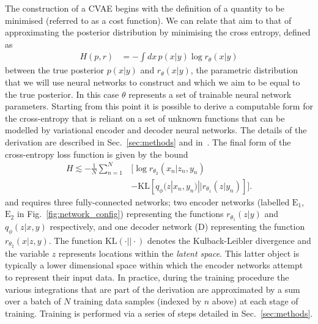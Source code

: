 \documentclass[%
showpacs,
 amsmath,amssymb,
 aps,
 twocolumn,
 prl,
 reprint,
floatfix,
]{revtex4-1}
\begin{document}
%
%
The construction of a \ac{CVAE} begins with the definition of a quantity to be
minimised (referred to as a cost function). We can relate that aim to
that of approximating the posterior distribution by minimising the cross
entropy, defined as
%
\begin{align}\label{eq:cross_ent} 
H(p,r) &= -\int dx\, p(x|y) \log r_{\theta}(x|y) 
\end{align}
%
between the true posterior $p(x|y)$ and $r_{\theta}(x|y)$, the parametric
distribution that we will use neural networks to construct and which we aim to
be equal to the true posterior. In this case $\theta$ represents a set of
trainable neural network parameters. Starting from this point it is possible to
derive a computable form for the cross-entropy that is reliant on a set of
unknown functions that can be modelled by variational encoder
and decoder neural networks. The details of the derivation are described in
Sec.~\ref{sec:methods} and in~\cite{1904.06264}. The final form of the
cross-entropy loss function is given by the bound
%
\begin{align}\label{eq:cost3}
H \lesssim -\frac{1}{N}\sum_{n=1}^{N}&\Big[\log
r_{\theta_{2}}(x_{n}|z_{n},y_{n})\nonumber\\
&-\text{KL}\left[q_{\phi}(z|x_{n},y_{n})||r_{\theta_{1}}(z|y_{n})\right]\Big].
\end{align}
%
and requires three fully-connected networks; two encoder networks (labelled
$\textrm{E}_1$, $\textrm{E}_2$ in Fig.~\ref{fig:network_config}) representing
the functions $r_{\theta_{1}}(z|y)$ and $q_{\phi}(z|x,y)$ respectively, and one
decoder network (D) representing the function $r_{\theta_{2}}(x|z,y)$. The
function $\text{KL}(\cdot||\cdot)$ denotes the Kulback-Leibler divergence and
the variable $z$ represents locations within the \emph{latent space}.  This
latter object is typically a lower dimensional space within which the encoder
networks attempt to represent their input data. In practice, during the
training procedure the various integrations that are part of the derivation are
approximated by a sum over a batch of $N$ training data samples (indexed by $n$
above) at each stage of training. Training is performed via a series of steps
detailed in Sec.~\ref{sec:methods}.
\end{document}
